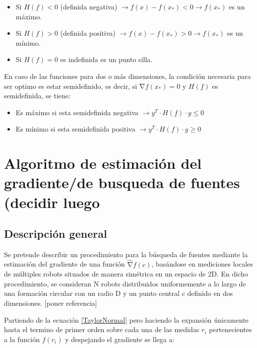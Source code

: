 \begin{itemize}
	\item Si ${H}\left(f\right)<0$ (definida negativa) $\rightarrow{f}\left(x\right)-f\left(x_{*}\right)<0\rightarrow{f}\left(x_{*}\right)$ es un máximo.
	\item Si ${H}\left(f\right)>0$ (definida positiva) $\rightarrow{f}\left(x\right)-f\left(x_{*}\right)>0\rightarrow{f}\left(x_{*}\right)$ es un mínimo.
	\item Si ${H}\left(f\right)=0$ es indefinida es un punto silla.
\end{itemize}

En caso de las funciones para dos o más dimensiones, la condición necesaria para ser optimo es estar semidefinido, es decir, si $\mathrm{\nabla}{f}{\left(x_{*}\right)}=0$ y ${H}\left(f\right)$ es semidefinida, se tiene:

\begin{itemize}
	\item Es máximo si esta semidefinida negativa $\rightarrow{y}^{T}\cdot{H}\left({f}\right)\cdot{y}\leq{0}$
	\item Es mínimo si esta semidefinida positiva $\rightarrow{y}^{T}\cdot{H}\left({f}\right)\cdot{y}\geq{0}$
\end{itemize}

\section{Algoritmo de estimación del gradiente/de busqueda de fuentes (decidir luego}


\subsection{Descripción general}

Se pretende describir un procedimiento para la búsqueda de fuentes mediante la estimación del gradiente de una función $\widehat{\mathrm{\nabla }}{f}\left(c\right)$, basándose en mediciones locales de múltiples robots situados de manera simétrica en un espacio de 2D. En dicho procedimiento, se consideran N robots distribuidos uniformemente a lo largo de una formación circular con un radio D y un punto central c definido en dos dimensiones. [poner referencia]

Partiendo de la ecuación \ref{TaylorNormal} pero haciendo la expansión únicamente hasta el termino de primer orden sobre cada una de las medidas $r_i$ pertenecientes a la función ${f}\left({r}_{i}\right)$ y despejando el gradiente se llega a:


